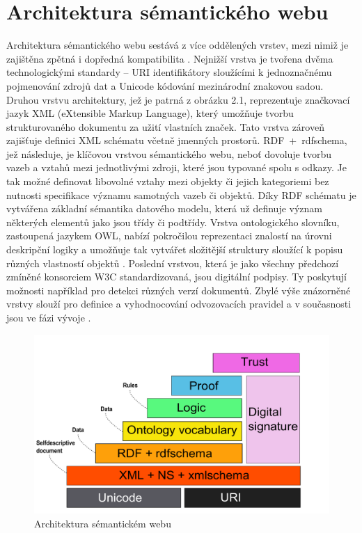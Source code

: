 \documentclass{projekt}
\begin{document}
\section{Architektura sémantického webu}
\hspace{0.65cm}Architektura sémantického webu sestává z více oddělených vrstev, mezi nimiž je zajištěna zpětná i dopředná kompatibilita \cite{_3}. Nejnižší vrstva je tvořena dvěma technologickými standardy – URI identifikátory sloužícími k jednoznačnému pojmenování zdrojů dat a Unicode kódování mezinárodní znakovou sadou. Druhou vrstvu architektury, jež je patrná z obrázku 2.1, reprezentuje značkovací jazyk XML (eXtensible Markup Language), který umožňuje tvorbu strukturovaného dokumentu za užití vlastních značek. Tato vrstva zároveň zajišťuje definici XML schématu včetně jmenných prostorů. RDF~+~rdfschema, jež následuje, je klíčovou vrstvou sémantického webu, neboť dovoluje tvorbu vazeb a vztahů mezi jednotlivými zdroji, které jsou typované spolu s odkazy. Je tak možné definovat libovolné vztahy mezi objekty či jejich kategoriemi bez nutnosti specifikace významu samotných vazeb či objektů. Díky RDF schématu je vytvářena základní sémantika datového modelu, která už definuje význam některých elementů jako jsou třídy či podtřídy. 
Vrstva ontologického slovníku, zastoupená jazykem OWL, nabízí pokročilou reprezentaci znalostí na úrovni deskripční logiky a umožňuje tak vytvářet složitější struktury sloužící k popisu různých vlastností objektů \cite{_2}. Poslední vrstvou, která je jako všechny předchozí zmíněné konsorciem W3C standardizovaná, jsou digitální podpisy. Ty poskytují možnosti například pro detekci různých verzí dokumentů. Zbylé výše znázorněné vrstvy slouží pro definice a vyhodnocování odvozovacích pravidel a v současnosti jsou ve fázi vývoje \cite{_1}.

\begin{figure}[htb]
\begin{center}
\includegraphics[scale=0.62]{architektura.pdf}
\caption{Architektura sémantickém webu \cite{_1}}
\end{center}
\end{figure}
\end{document}
